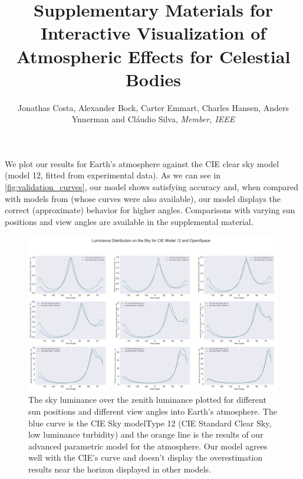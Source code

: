 \documentclass[preprint,journal]{vgtc}       %
\title{Supplementary Materials for Interactive Visualization of Atmospheric Effects for Celestial Bodies}
\author{Jonathas Costa, Alexander Bock, Carter Emmart, Charles Hansen, Anders Ynnerman and Cl\'audio Silva, \textit{Member, IEEE}}
\begin{document}

\onecolumn
\maketitle


We plot our results for Earth's atmosphere against the CIE clear sky model~\cite{Darula:2002} (model 12, fitted from experimental data). As we can see in \autoref{fig:validation_curves}, our model shows satisfying accuracy and, when compared with models from \cite{BrunetonNeyret:2008, Preetham:1999, Zotti:2007} (whose curves were also available), our model displays the correct (approximate) behavior for higher angles.  Comparisons with varying sun positions and view angles are available in the supplemental material.

\begin{figure}[!h]
  \centering
  \includegraphics[width=\linewidth]{validation_curves_new.jpg}
  \caption{The sky luminance over the zenith luminance plotted for different sun positions and different view angles into Earth's atmosphere. The blue curve is the CIE Sky modelType 12 (CIE Standard Clear Sky, low luminance turbidity) and the orange line is the results of our advanced parametric model for the atmosphere. Our model agrees well with the CIE's curve and doesn't display the overestimation results near the horizon displayed in other models.}
  \label{fig:validation_curves}
\end{figure}
\end{document}
